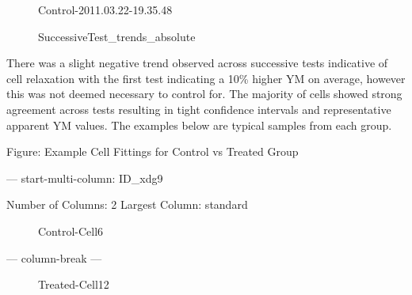 \documentclass[
  paper=a4,
  ,captions=tableheading
]{scrartcl}
\makeatletter
\newenvironment{Shaded}{}{}
\newcommand{\NormalTok}[1]{#1}
\newcommand*\pandocbounded[1]{%
  \sbox\pandoc@box{#1}%
  \Gscale@div\@tempa{\textheight}{\dimexpr\ht\pandoc@box+\dp\pandoc@box\relax}%
  \Gscale@div\@tempb{\linewidth}{\wd\pandoc@box}%
  \ifdim\@tempb\p@<\@tempa\p@\let\@tempa\@tempb\fi%
  \ifdim\@tempa\p@<\p@\scalebox{\@tempa}{\usebox\pandoc@box}%
  \else\usebox{\pandoc@box}%
  \fi%
}
\makeatother
\begin{document}
\begin{figure}
\centering
\pandocbounded{}
\caption{Control-2011.03.22-19.35.48}
\end{figure}

\begin{figure}
\centering
\pandocbounded{}
\caption{SuccessiveTest\_trends\_absolute}
\end{figure}

There was a slight negative trend observed across successive tests
indicative of cell relaxation with the first test indicating a 10\%
higher YM on average, however this was not deemed necessary to control
for. The majority of cells showed strong agreement across tests
resulting in tight confidence intervals and representative apparent YM
values. The examples below are typical samples from each group.

Figure: Example Cell Fittings for Control vs Treated Group

--- start-multi-column: ID\_xdg9

\begin{Shaded}
\begin{Highlighting}[]
\NormalTok{Number of Columns: 2}
\NormalTok{Largest Column: standard}
\end{Highlighting}
\end{Shaded}

\begin{figure}
\centering
\pandocbounded{}
\caption{Control-Cell6}
\end{figure}

--- column-break ---

\begin{figure}
\centering
\pandocbounded{}
\caption{Treated-Cell12}
\end{figure}
\end{document}
